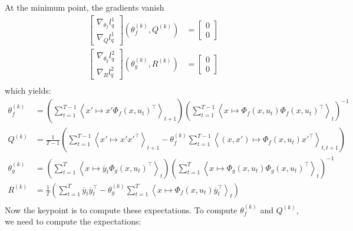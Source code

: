 At the minimum point, the gradients vanish
\begin{align*}
  \left[
    \begin{array}{c} \nabla_{\theta_f} l^1_q \\ \nabla_{Q} l^1_q \end{array}
  \right] \left(\theta_f^{(k)}, Q^{(k)}\right) &=
  \left[
    \begin{array}{c} 0 \\ 0 \end{array}
  \right]\\
  \left[
    \begin{array}{c} \nabla_{\theta_g} l^2_q \\ \nabla_{R} l^2_q \end{array}
  \right] \left(\theta_g^{(k)}, R^{(k)} \right) &=
  \left[
    \begin{array}{c} 0 \\ 0 \end{array}
  \right] \\
\end{align*}
which yields:
\begin{align*}
  \theta_f^{(k)} &=
    \left(
      \sum_{t=1}^{T-1}{\left< x' \mapsto x' \Phi_f(x,u_t)^{\top} \right>_{t+1}}
    \right)
    \left(
      \sum_{t=1}^{T-1}{\left< x \mapsto \Phi_f(x, u_t)\Phi_f(x,u_t)^{\top} \right>_{t}}
    \right)^{-1}
  \\
  Q^{(k)} &=
    \frac{1}{T-1}
    \left(
      \sum_{t=1}^{T-1}{\left< x' \mapsto x'x'^{\top} \right>_{t+1}} -
      \theta_f^{(k)} \sum_{t=1}^{T-1}{\left< (x,x') \mapsto \Phi_f(x, u_t) x'^{\top} \right>_{t,t+1}}
    \right)
  \\
  \theta_g^{(k)} &=
    \left(
      \sum_{t=1}^{T}{\left< x \mapsto \overline{y}_{t}\Phi_g(x,u_t)^{\top} \right>_{t}}
    \right)
    \left(
      \sum_{t=1}^{T}{\left< x \mapsto \Phi_g(x,u_t)\Phi_g(x,u_t)^{\top} \right>_{t}}
    \right)^{-1}
  \\
  R^{(k)} &=
    \frac{1}{T}
    \left(
      \sum_{t=1}^{T}{\overline{y}_t \overline{y}_t^{\top}} -
      \theta_g^{(k)} \sum_{t=1}^{T}{\left< x \mapsto \Phi_f(x, u_t) \overline{y}_t^{\top} \right>_{t}}
    \right)
  \\
\end{align*}
Now the keypoint is to compute these expectations.
To compute $\theta_f^{(k)}$ and $Q^{(k)}$, we need to compute the expectations:
